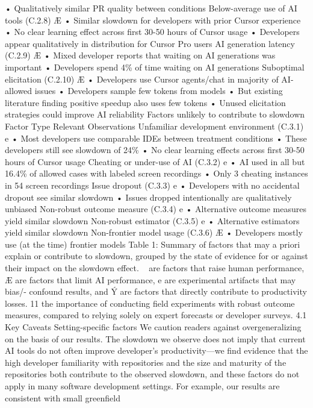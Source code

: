 • Qualitatively similar PR quality between conditions
Below-average use of AI tools (C.2.8)
Æ
• Similar slowdown for developers with prior Cursor experience
• No clear learning effect across first 30-50 hours of Cursor usage
• Developers appear qualitatively in distribution for Cursor Pro users
AI generation latency (C.2.9)
Æ
• Mixed developer reports that waiting on AI generations was important
• Developers spend 4\% of time waiting on AI generations
Suboptimal elicitation (C.2.10)
Æ
• Developers use Cursor agents/chat in majority of AI-allowed issues
• Developers sample few tokens from models
• But existing literature finding positive speedup also uses few tokens
• Unused elicitation strategies could improve AI reliability
Factors unlikely to contribute to slowdown
Factor
Type
Relevant Observations
Unfamiliar
development
environment
(C.3.1)
e
• Most developers use comparable IDEs between treatment conditions
• These developers still see slowdown of 24\%
• No clear learning effects across first 30-50 hours of Cursor usage
Cheating or under-use of AI (C.3.2)
e
• AI used in all but 16.4\% of allowed cases with labeled screen recordings
• Only 3 cheating instances in 54 screen recordings
Issue dropout (C.3.3)
e
• Developers with no accidental dropout see similar slowdown
• Issues dropped intentionally are qualitatively unbiased
Non-robust outcome measure (C.3.4)
e
• Alternative outcome measures yield similar slowdown
Non-robust estimator (C.3.5)
e
• Alternative estimators yield similar slowdown
Non-frontier model usage (C.3.6)
Æ
• Developers mostly use (at the time) frontier models
Table 1: Summary of factors that may a priori explain or contribute to slowdown, grouped by the
state of evidence for or against their impact on the slowdown effect.   are factors that raise human
performance, Æ are factors that limit AI performance, e are experimental artifacts that may bias/-
confound results, and Ý are factors that directly contribute to productivity losses.
11
the importance of conducting field experiments with robust outcome measures, compared to relying
solely on expert forecasts or developer surveys.
4.1
Key Caveats
Setting-specific factors
We caution readers against overgeneralizing on the basis of our results.
The slowdown we observe does not imply that current AI tools do not often improve developer’s
productivity—we find evidence that the high developer familiarity with repositories and the size and
maturity of the repositories both contribute to the observed slowdown, and these factors do not apply
in many software development settings. For example, our results are consistent with small greenfield
